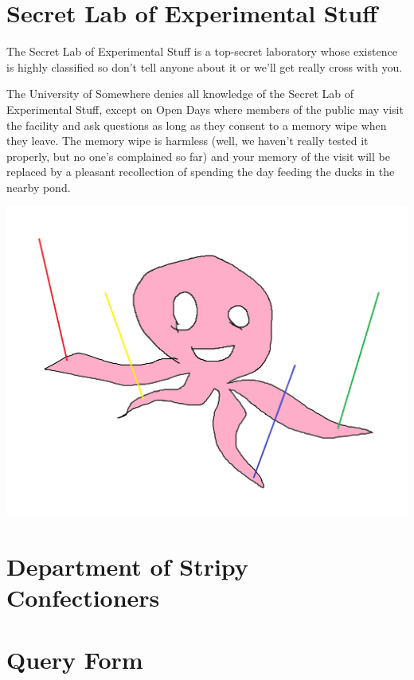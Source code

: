 \documentclass[a4paper,12pt,notumble]{leaflet}
\begin{document}
\newpage
\raggedright

\section{Secret Lab of Experimental Stuff}

The Secret Lab of Experimental Stuff is a top-secret laboratory
whose existence is highly classified so don't tell anyone about it
or we'll get really cross with you.

The University of Somewhere denies all knowledge of the Secret Lab
of Experimental Stuff, except on Open Days where members of the
public may visit the facility and ask questions as long as they
consent to a memory wipe when they leave. The memory wipe is
harmless (well, we haven't really tested it properly, but no one's
complained so far) and your memory of the visit will be replaced by
a pleasant recollection of spending the day feeding the ducks in the
nearby pond.

\begin{flushright}
\includegraphics[scale=0.2]{../Logos/gestikulaser.png}
\end{flushright}

\section{Department of Stripy Confectioners}


\newpage
\section{Query Form}
\end{document}
